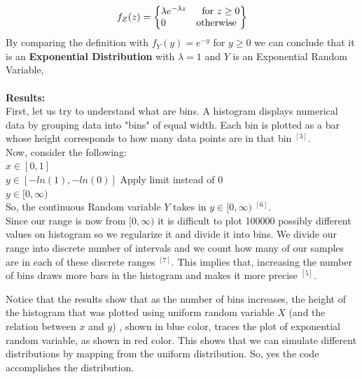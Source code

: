 \documentclass[answers]{exam}
\begin{document}
\begin{framed}
 \[
    f_Z(z) = \left\{\begin{array}{@{}lr@{}}
        \lambda e ^ {- \lambda z }& \text{for } z \geq 0\\
        0 & \text{otherwise }
        \end{array}\right\} 
  \]
By comparing the definition with $f_Y(y) = e^{-y}$ for $y \geq 0$  we can conclude that it is an \textbf{Exponential Distribution} with $\lambda = 1 $ and $Y$ is an Exponential Random Variable, \\ \\ 
\textbf{Results:}\\
First, let us try to understand what are bins. A histogram displays numerical data by grouping data into "bins" of equal width. Each bin is plotted as a bar whose height corresponds to how many data points are in that bin $^{[3]}$. \\
Now, consider the following: \\
$x \in [0, 1]$\\
$y \in [-ln(1), -ln(0)]$ Apply limit instead of 0\\
$y \in [0, \infty)$\\
So, the continuous Random variable $Y$ takes in $y \in [0, \infty)$ $^{[6]}$.\\
Since our range is now from $[0, \infty)$ it is difficult to plot 100000 possibly different values on histogram so we regularize it and divide it into bins. We divide our range into discrete number of intervals and we count how many of our samples are in each of these discrete ranges $^{[7]}$. 
This implies that, increasing the number of bins draws more bars in the histogram and makes it more precise $^{[5]}$.  

Notice that the results show that as the number of bins increases, the height of the histogram that was plotted using uniform random variable $X$ (and the relation between $x$ and $y$) , shown in blue color, traces the plot of exponential random variable, as shown in red color. This shows that we can simulate different distributions by mapping from the uniform distribution. So, yes the code accomplishes the distribution. \\

\end{framed}
\end{document}
